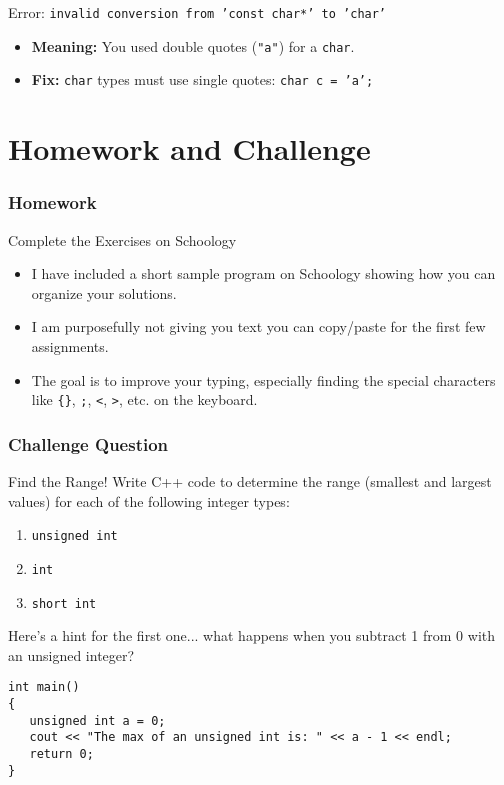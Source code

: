 \documentclass{beamer}
\begin{document}
\begin{frame}
    
\begin{alertblock}{Error: \texttt{invalid conversion from 'const char*' to 'char'}}
\begin{itemize}
    \item \textbf{Meaning:} You used double quotes (\texttt{"a"}) for a \texttt{char}.
    \item \textbf{Fix:} \texttt{char} types must use single quotes: \texttt{char c = 'a';}
\end{itemize}
\end{alertblock}
\end{frame}

\section{Homework and Challenge}

\begin{frame}
\frametitle{Homework}
\begin{block}{Complete the Exercises on Schoology}
\begin{itemize}
    \item I have included a short sample program on Schoology showing how you can organize your solutions.
    \item I am purposefully not giving you text you can copy/paste for the first few assignments.
    \item The goal is to improve your typing, especially finding the special characters like \texttt{\{\}}, \texttt{;}, \texttt{<}, \texttt{>}, etc. on the keyboard.
\end{itemize}
\end{block}
\end{frame}

\begin{frame}[fragile]
\frametitle{Challenge Question}
\begin{exampleblock}{Find the Range!}
Write C++ code to determine the range (smallest and largest values) for each of the following integer types:
\begin{enumerate}
    \item \texttt{unsigned int}
    \item \texttt{int}
    \item \texttt{short int}
\end{enumerate}
Here's a hint for the first one... what happens when you subtract 1 from 0 with an unsigned integer?
\begin{verbatim}
int main()
{
   unsigned int a = 0;
   cout << "The max of an unsigned int is: " << a - 1 << endl;
   return 0;
}
\end{verbatim}
\end{exampleblock}
\end{frame}
\end{document}
